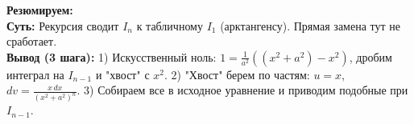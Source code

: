 \begin{tcolorbox}[colback=gray!5, colframe=black, boxrule=0.5pt, arc=0pt]
\textbf{Резюмируем:} \\
\textbf{Суть:} Рекурсия сводит $I_n$ к табличному $I_1$ (арктангенсу). Прямая замена тут не сработает. \\
\textbf{Вывод (3 шага):} 1) Искусственный ноль: $1=\frac{1}{a^2}((x^2+a^2)-x^2)$, дробим интеграл на $I_{n-1}$ и "хвост" с $x^2$. 2) "Хвост" берем по частям: $u=x$, $dv=\frac{x\,dx}{(x^2+a^2)^n}$. 3) Собираем все в исходное уравнение и приводим подобные при $I_{n-1}$.
\end{tcolorbox}